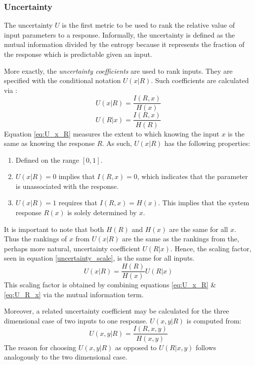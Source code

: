 \documentclass[a4paper, 12pt]{article}
\begin{document}
\subsubsection{Uncertainty}
\label{sec:uncertainty}

The uncertainty $U$ is the first metric to be used to rank the relative value of input 
parameters to a response.  Informally, the uncertainty is defined
as the mutual information divided by the entropy because it represents the fraction of the 
response which is predictable given an input.

More exactly, the \emph{uncertainty coefficients} are used to rank inputs.  They are specified with the 
conditional notation $U(x|R)$.  Such coefficients are calculated via \cite{Yao2003}:
\begin{equation}
U(x|R) = \frac{I(R,x)}{H(x)}
\label{eq:U_x_R}
\end{equation}
\begin{equation}
U(R|x) = \frac{I(R,x)}{H(R)}
\label{eq:U_R_x}
\end{equation}
Equation \ref{eq:U_x_R} measures the extent to which knowing the input $x$ is the same as knowing the response $R$.  As such, $U(x|R)$ has the following properties:
\begin{enumerate}
    \item Defined on the range $[0, 1]$.
    \item $U(x|R) = 0$ implies that $I(R,x) = 0$, which indicates that the parameter
        is unassociated with the response.
    \item $U(x|R) = 1$ requires that $I(R,x) = H(x)$.  This implies that
        the system response $R(x)$ is solely determined by $x$.
\end{enumerate}

It is important to note that both $H(R)$ and $H(x)$ are the same for all $x$.  Thus the rankings of $x$ from $U(x|R)$ are the same as the rankings from the, perhaps more natural, uncertainty coefficient $U(R|x)$.  Hence, the scaling factor, seen in equation \ref{uncertainty_scale}, is the same for all inputs.
\begin{equation}
U(x|R) = \frac{H(R)}{H(x)} U(R|x)
\label{uncertainty_scale}
\end{equation}
This scaling factor is obtained by combining equations \ref{eq:U_x_R} \& \ref{eq:U_R_x} via the mutual 
information term.

Moreover, a related uncertainty coefficient may be calculated for the three dimensional case of two inputs to one
response.  $U(x,y|R)$ is computed from:
\begin{equation} U(x,y|R) = \frac{I(R,x,y)}{H(x,y)} \end{equation}
The reason for choosing $U(x,y|R)$ as opposed to $U(R|x,y)$ follows analogously to the two dimensional case.
\end{document}
